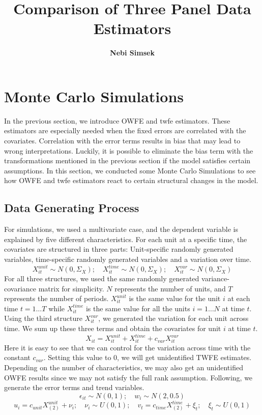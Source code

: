 \documentclass[12pt, a4paper]{article}
\begin{document}
\title{Comparison of Three Panel Data Estimators}
\author{\textbf{\LARGE{Nebi Simsek}}}
\date{}

\maketitle
\vspace*{3em}
\tableofcontents
\pagebreak

% 

\section{Monte Carlo Simulations}
In the previous section, we introduce \ac{OWFE} and \ac{twfe} estimators.
These estimators are especially needed when the fixed errors are correlated with the covariates.
Correlation with the error terms results in bias that may lead to wrong interpretations.
Luckily, it is possible to eliminate the bias term with the transformations mentioned in the previous
section if the model satisfies certain assumptions. In this section, we conducted some
Monte Carlo Simulations to see how \ac{OWFE} and \ac{twfe} estimators
react to certain structural changes in the model.
\subsection{Data Generating Process}
For simulations, we used a multivariate case, and the dependent variable is
explained by five different characteristics. For each unit at a specific time,
the covariates are structured in three parts: Unit-specific randomly
generated variables, time-specific randomly generated variables
and a variation over time.
$$X_{it}^{unit} \sim N(0, \Sigma_{X}); \quad
X_{it}^{time} \sim N(0, \Sigma_{X}); \quad
X_{it}^{var} \sim N(0, \Sigma_{X})
$$
For all three structures, we used the same randomly generated variance-covariance
matrix for simplicity. $N$ represents the number of units, and $T$ represents
the number of  periods. $X_{it}^{unit}$ is the same value for the unit $i$
at each time $t = 1 \ldots T$ while $X_{it}^{time}$ is the same value for
all the units $i = 1 \ldots N$ at time $t$. Using the third structure $X_{it}^{var}$,
we generated the variation for each unit across time. We sum up these three terms
and obtain the covariates for unit $i$ at time $t$.
$$X_{it} = X_{it}^{unit} + X_{it}^{time} + c_{var} X_{it}^{var}$$
Here it is easy to see that we can control for the variation across time with the constant $c_{var}$. Setting this value to $0$, we will get unidentified TWFE estimates.
Depending on the number of characteristics, we may also get an unidentified \ac{OWFE} results since we may not satisfy the full rank assumption. Following, we generate the error terms and trend variables.
$$\epsilon_{it} \sim N(0, 1); \quad w_{i} \sim N(2, 0.5)$$
$$u_i = c_{unit}X_{(2)}^{unit} + \nu_{i}; \quad \nu_{i} \sim U(0,1);
\quad v_t = c_{time}X_{(2)}^{time}  + \xi_{t}; \quad \xi_{t} \sim U(0,1)$$
\end{document}
